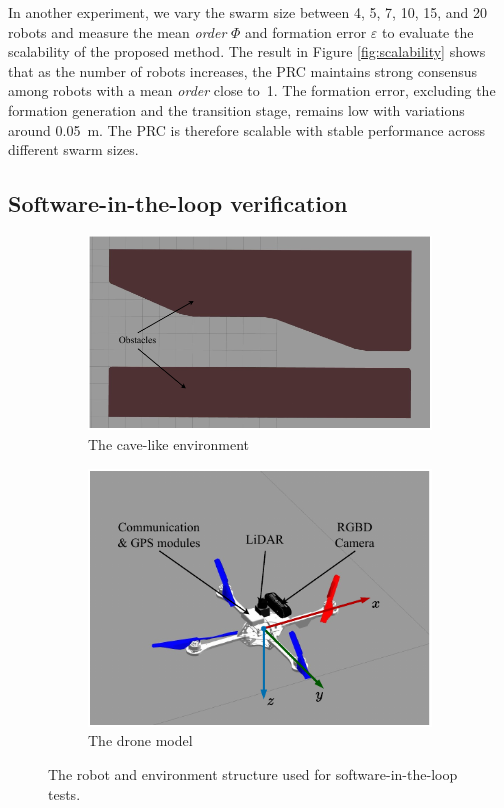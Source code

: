 In another experiment, we vary the swarm size between 4, 5, 7, 10, 15, and 20 robots and measure the mean \textit{order} $\Phi$ and formation error $\varepsilon$ to evaluate the scalability of the proposed method. The result in Figure \ref{fig:scalability} shows that as the number of robots increases, the PRC maintains strong consensus among robots with a mean \textit{order} close to~1. The formation error, excluding the formation generation and the transition stage, remains low with variations around 0.05~m. The PRC is therefore scalable with stable performance across different swarm sizes.

\subsection{Software-in-the-loop verification}
\begin{figure}
    \centering
    \begin{subfigure}[b]{0.56\textwidth}
    \includegraphics[width=\textwidth]{paper3/images/tunnel.pdf}
    \caption{The cave-like environment}
    \label{fig:gazebo_tunnel}
    \end{subfigure}
    \begin{subfigure}[b]{0.42\textwidth}
    \includegraphics[width=\textwidth]{paper3/images/hummingbird.pdf}
    \caption{The drone model~\cite{Bui2022,Furrer2016}}
    \label{fig:gazebo_hummingbird}
    \end{subfigure}
    \caption{The robot and environment structure used for software-in-the-loop tests.}
    \label{fig:sil}
\end{figure}
